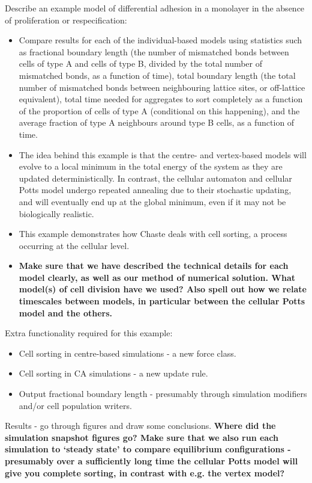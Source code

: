 \documentclass{article}
\newcommand{\highlight}[1]{{\color{red} \bf{#1}}}
\begin{document}
\noindent Describe an example model of differential adhesion in a monolayer in the absence of proliferation or respecification:
\begin{itemize}
\item Compare results for each of the individual-based models using statistics such as fractional boundary length (the number of mismatched bonds between cells of type A and cells of type B, divided by the total number of mismatched bonds, as a function of time), total boundary length (the total number of mismatched bonds between neighbouring lattice sites, or off-lattice equivalent), total time needed for aggregates to sort completely as a function of the proportion of cells of type A (conditional on this happening), and the average fraction of type A neighbours around type B cells, as a function of time.
\item The idea behind this example is that the centre- and vertex-based models will evolve to a local minimum in the total energy of the system as they are updated deterministically. In contrast, the cellular automaton and cellular Potts model undergo repeated annealing due to their stochastic updating, and will eventually end up at the global minimum, even if it may not be biologically realistic.
\item This example demonstrates how Chaste deals with cell sorting, a process occurring at the cellular level.
\item \highlight{Make sure that we have described the technical details for each model clearly, as well as our method of numerical solution. 
What model(s) of cell division have we used?
Also spell out how we relate timescales between models, in particular between the cellular Potts model and the others.}
\end{itemize}

\noindent Extra functionality required for this example:
\begin{itemize}
\item Cell sorting in centre-based simulations - a new force class.
\item Cell sorting in CA simulations - a new update rule.
\item Output fractional boundary length - presumably through simulation modifiers and/or cell population writers.
\end{itemize}

\noindent Results - go through figures and draw some conclusions. 
\highlight{Where did the simulation snapshot figures go? 
Make sure that we also run each simulation to `steady state' to compare equilibrium configurations - presumably over a sufficiently long time the cellular Potts model will give you complete sorting, in contrast with e.g. the vertex model?}
\end{document}
